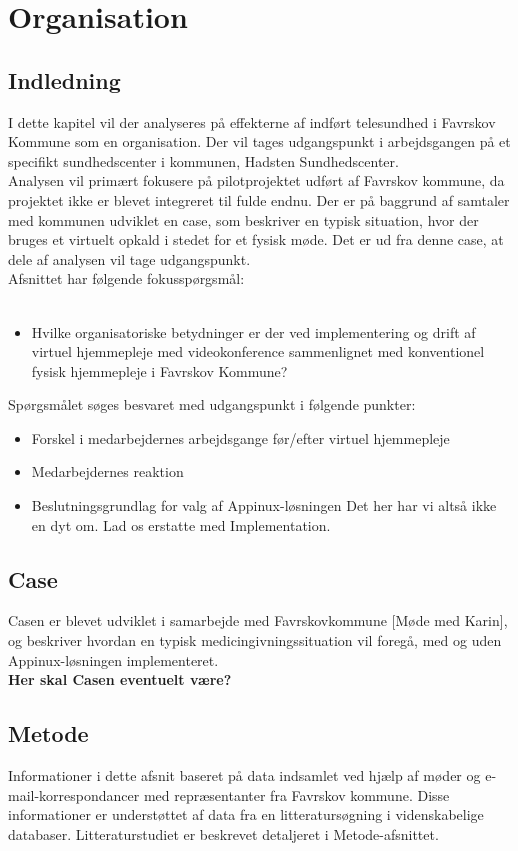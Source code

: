 \chapter{Organisation}

\section{Indledning}
I dette kapitel vil der analyseres på effekterne af indført telesundhed i Favrskov Kommune som en organisation. Der vil tages udgangspunkt i arbejdsgangen på et specifikt sundhedscenter i kommunen, Hadsten Sundhedscenter. \\
Analysen vil primært fokusere på pilotprojektet udført af Favrskov kommune, da projektet ikke er blevet integreret til fulde endnu. Der er på baggrund af samtaler med kommunen udviklet en case, som beskriver en typisk situation, hvor der bruges et virtuelt opkald i stedet for et fysisk møde. Det er ud fra denne case, at dele af analysen vil tage udgangspunkt.  \\
Afsnittet har følgende fokusspørgsmål:\\
\\
\begin{itemize}
\item{Hvilke organisatoriske betydninger er der ved implementering og drift af virtuel hjemmepleje med videokonference sammenlignet med konventionel fysisk hjemmepleje i Favrskov Kommune?}
\end{itemize}
Spørgsmålet søges besvaret med udgangspunkt i følgende punkter:
\begin{itemize}
\item{Forskel i medarbejdernes arbejdsgange før/efter virtuel hjemmepleje}
\item{Medarbejdernes reaktion}
\item{Beslutningsgrundlag for valg af Appinux-løsningen Det her har vi altså ikke en dyt om. Lad os erstatte med Implementation.}
\end{itemize}
\section{Case}
Casen er blevet udviklet i samarbejde med Favrskovkommune [Møde med Karin], og beskriver hvordan en typisk medicingivningssituation vil foregå, med og uden Appinux-løsningen implementeret. \\
\textbf{Her skal Casen eventuelt være?}
\section{Metode}
Informationer i dette afsnit baseret på data indsamlet ved hjælp af møder og e-mail-korrespondancer med repræsentanter fra Favrskov kommune. Disse informationer er understøttet af data fra en litteratursøgning i videnskabelige databaser. Litteraturstudiet er beskrevet detaljeret i Metode-afsnittet. \\
